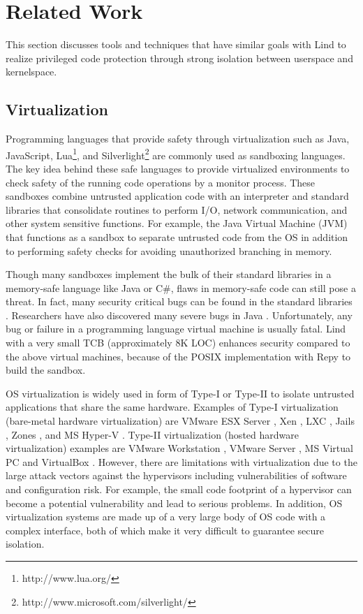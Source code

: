 \section{Related Work}
\label{sec.related_work}

This section discusses tools and techniques that have similar goals with Lind to realize privileged code protection through strong isolation between userspace and kernelspace.

	
\subsection{Virtualization}

Programming languages that provide safety through virtualization such as Java, JavaScript, Lua\footnote{http://www.lua.org/}, and Silverlight\footnote{http://www.microsoft.com/silverlight/} are commonly used as sandboxing languages. The key idea behind these safe languages to provide virtualized environments to check safety of the running code operations by a monitor process. These sandboxes combine untrusted application code with an interpreter and standard libraries that consolidate routines to perform I/O, network communication, and other system sensitive functions. For example, the Java Virtual Machine (JVM) that functions as a sandbox to separate untrusted code from the OS in addition to performing safety checks for avoiding unauthorized branching in memory.

Though many sandboxes implement the bulk of their standard libraries in a memory-safe language like Java or C\#, flaws in memory-safe code can still pose a threat. In fact, many security critical bugs can be found in the standard libraries \cite{JavaBugs}. Researchers have also discovered many severe bugs in Java \cite{Java-Lessons}. Unfortunately, any bug or failure in a programming language virtual machine is usually fatal. Lind with a very small TCB (approximately 8K LOC) enhances security compared to the above virtual machines,  because of the POSIX implementation with Repy to build the sandbox.

OS virtualization is widely used in form of Type-I or Type-II to isolate untrusted applications that share the same hardware. Examples of Type-I virtualization (bare-metal hardware virtualization) are VMware ESX Server \cite{VMWare-ESX-Server}, Xen \cite{Xen-03}, LXC \cite{LXC}, Jails \cite{Jails}, Zones \cite{Zones}, and MS Hyper-V \cite{Microsoft-Hyper-V}. Type-II virtualization (hosted hardware virtualization) examples are VMware Workstation \cite{VMWare-Workstation}, VMware Server \cite{VMWare-Server}, MS Virtual PC \cite{Microsoft-Virtual-PC} and VirtualBox \cite{VirtualBox}. However, there are limitations with virtualization due to the large attack vectors against the hypervisors including vulnerabilities of software and configuration risk. For example, the small code footprint of a hypervisor can become a potential vulnerability and lead to serious problems. In addition, OS virtualization systems are made up of a very large body of OS code with a complex interface, both of which make it very difficult to guarantee secure isolation.

